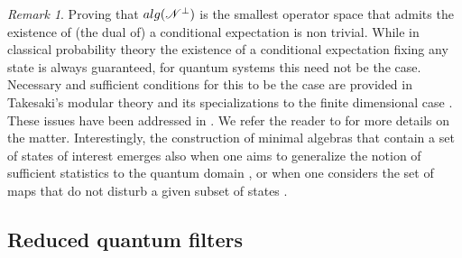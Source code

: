 \documentclass[aihp,12pt]{imsart}
\newcommand{\Ns}{\mathscr{N}}
\newcommand{\alg}{{\rm alg}}
\theoremstyle{theorem}
\theoremstyle{definition}
\theoremstyle{remark}
\newtheorem{remark}{Remark}
\begin{document}
\begin{remark}
    Proving that $\alg(\Ns^\perp)$ is the smallest operator space that admits the existence of (the dual of) a conditional expectation is non trivial. While in classical probability theory the existence of a conditional expectation fixing any state is always guaranteed, for quantum systems this need not be the case. Necessary and sufficient conditions for this to be the case are provided in Takesaki's modular theory and its specializations to the finite dimensional case \cite{TAKESAKI1972306,petz2007quantum,tit2023}. These issues have been addressed in \cite[Theorem 4]{tit2023}. We refer the reader to \cite[Sections IV and V]{tit2023} for more details on the matter. Interestingly, the construction of minimal algebras that contain a set of states of interest emerges also when one aims to generalize the notion of sufficient statistics to the quantum domain \cite{jenvcova2006sufficiency}, or when one considers the set of maps that do not disturb a given subset of states \cite{PhysRevA.66.022318}.
\end{remark}

\subsection{Reduced quantum filters}
\end{document}

